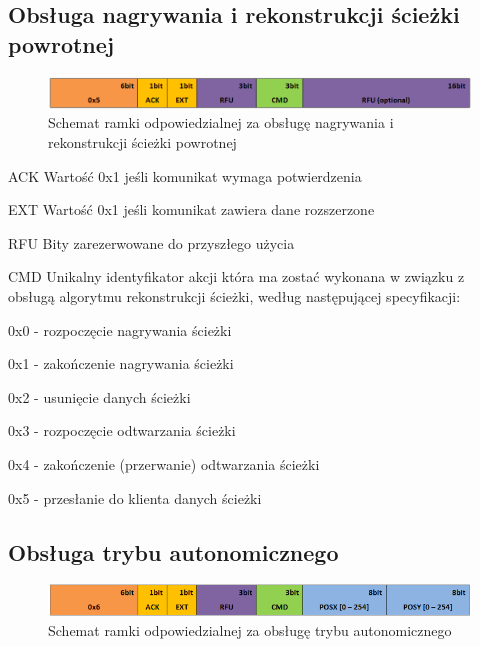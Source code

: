\subsection{Obsługa nagrywania i rekonstrukcji ścieżki powrotnej}
\begin{figure}[h!]
 \centering
 \includegraphics[width=\textwidth]{../images/appendix/cmd_0x05.png}
 \caption{Schemat ramki odpowiedzialnej za obsługę nagrywania i rekonstrukcji ścieżki powrotnej}
 \label{fig:CMD_0x05}
\end{figure}

\begin{basedescript}{\desclabelstyle{\pushlabel}\desclabelwidth{25mm}}
\setlength{\parsep}{0pt}
\setlength{\itemsep}{0mm}
\setlength{\parskip}{0pt}
\item[ACK]
	Wartość 0x1 jeśli komunikat wymaga potwierdzenia
\item[EXT] 
	Wartość 0x1 jeśli komunikat zawiera dane rozszerzone
\item[RFU] 
	Bity zarezerwowane do przyszłego użycia
\item[CMD] 
	Unikalny identyfikator akcji która ma zostać wykonana w związku z obsługą
	algorytmu rekonstrukcji ścieżki, według następującej specyfikacji:
	\begin{desc}
	\item[0x0] - rozpoczęcie nagrywania ścieżki
	\item[0x1] - zakończenie nagrywania ścieżki
	\item[0x2] - usunięcie danych ścieżki
	\item[0x3] - rozpoczęcie odtwarzania ścieżki
	\item[0x4] - zakończenie (przerwanie) odtwarzania ścieżki
	\item[0x5] - przesłanie do klienta danych ścieżki
	\end{desc}
\end{basedescript}

\subsection{Obsługa trybu autonomicznego}
\begin{figure}[h!]
 \centering
 \includegraphics[width=\textwidth]{../images/appendix/cmd_0x06.png}
 \caption{Schemat ramki odpowiedzialnej za obsługę trybu autonomicznego}
 \label{fig:CMD_0x06}
\end{figure}

